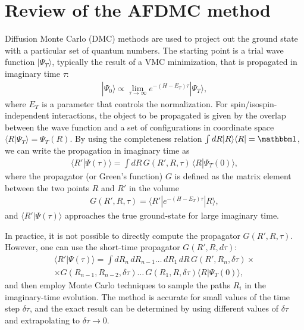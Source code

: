 \documentclass[aps,prc,twocolumn,superscriptaddress,floatfix]{revtex4-1}
\begin{document}
\section{Review of the AFDMC method}
\label{sec:afdmc}
Diffusion Monte Carlo (DMC) methods are used to project out the ground state
with a particular set of quantum numbers. The starting point is a trial wave
function $|\Psi_T\rangle$, typically the result of a VMC minimization, that is
propagated in imaginary time $\tau$:
\begin{align}
|\Psi_0\rangle\propto \lim_{\tau\rightarrow\infty} e^{-(H-E_T)\tau}|\Psi_T\rangle ,
\end{align}
where $E_T$ is a parameter that controls the normalization. 
For spin/isospin-independent interactions, the object to be propagated 
is given by the overlap between the wave function and a set of configurations in 
coordinate space $\langle R|\Psi_T\rangle=\Psi_T(R)$. 
By using the completeness relation $\int dR |R\rangle\langle R|=\mathbbm1$,
we can write the propagation in imaginary time as
\begin{align}
\langle R'|\Psi(\tau)\rangle=\displaystyle\int dR\,G(R',R,\tau)\,\langle R|\Psi_T(0)\rangle ,
\label{eq:imtimeprop}
\end{align}
where the propagator (or Green's function) $G$ is defined as the matrix element between
the two points $R$ and $R'$ in the volume
\begin{align}
G(R',R,\tau)=\langle R'|e^{-(H-E_T)\tau}|R\rangle,
\end{align}
and $\langle R'|\Psi(\tau)\rangle$ approaches the true ground-state 
for large imaginary time.

In practice, it is not possible to directly compute
the propagator $G(R',R,\tau)$. 
However, one can use the short-time propagator $G(R',R,d\tau)$:
\begin{align}
\langle R'|\Psi(\tau)\rangle=
\int dR_n\,dR_{n-1}\ldots\,dR_1\,dR\,G(R',R_n,\delta\tau)\times\nonumber \\
\times G(R_{n-1},R_{n-2},\delta\tau)\ldots\,G(R_1,R,\delta\tau)
\langle R|\Psi_T(0)\rangle,
\end{align}
and then employ Monte Carlo techniques to sample the paths $R_i$ in the
imaginary-time evolution. The method is accurate for small values of 
the time step $\delta\tau$, and the exact result 
can be determined by using different values of $\delta\tau$ 
and extrapolating to $\delta\tau\to0$.
\end{document}
